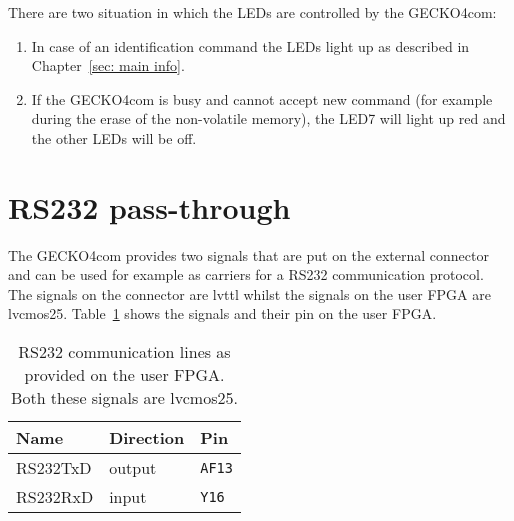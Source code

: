 There are two situation in which the LEDs are controlled by the {\sc GECKO4com}:
\begin{enumerate}
\item In case of an identification command the LEDs light up as described in
Chapter~\ref{sec: main info}.
\item If the {\sc GECKO4com} is busy and cannot accept new command (for example during the erase of the non-volatile
memory), the LED7 will light up red and the other LEDs will be off.
\end{enumerate}
\section{RS232 pass-through}
The {\sc GECKO4com} provides two signals that are put on the external connector
and can be used for example as carriers for a RS232 communication protocol. The
signals on the connector are {\sc lvttl} whilst the signals on the user FPGA are
{\sc lvcmos25}. Table~\ref{tab:rs232} shows the signals and their pin on the user FPGA.
\begin{table}[h]
\centering%
\begin{tabular}{|l|l|l|}
\hline
\textbf{Name}&\textbf{Direction}&\textbf{Pin}\\
\hline
\hline
RS232TxD&{\sc output}&\verb+AF13+\\
\hline
RS232RxD&{\sc input}&\verb+Y16+\\
\hline
\end{tabular}
\caption{RS232 communication lines as provided on the user FPGA. Both these
signals are {\sc lvcmos25}.}
\label{tab:rs232}
\end{table}
